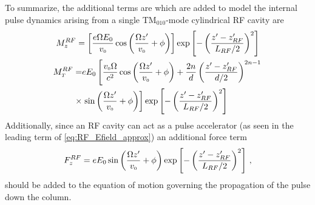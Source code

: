 To summarize, the additional terms are which are added to model the internal pulse dynamics arising from a single TM$_{010}$-mode cylindrical RF cavity are
\begin{gather}
  M_{z}^{RF} = \left [ \frac{ e \Omega E_{0} }{ v_{{\scriptscriptstyle 0}} } \cos \left ( \frac{ \Omega z^{\prime} }{ v_{{\scriptscriptstyle 0}} } + \phi \right ) \right ] \exp \left [ - \left (  \frac{ z^{\prime} - z_{RF}^{\prime} }{ L_{RF} / 2 } \right )^{ 2 } \right ] \\
  \begin{aligned}
  M_{{\scriptscriptstyle T}}^{RF} = & e E_{0} \left [ \frac{ v_{{\scriptscriptstyle 0}} \Omega }{c^{2}} \cos \left ( \frac{ \Omega z^{\prime} }{ v_{{\scriptscriptstyle 0}} } + \phi \right ) + \frac{2 n}{d} \left ( \frac{z^{\prime} - z^{\prime}_{RF}}{d / 2} \right )^{2 n - 1} \right. \\ \times & \left. \sin \left ( \frac{ \Omega z^{\prime} }{ v_{{\scriptscriptstyle 0}} } + \phi \right )
   \right ] \exp \left [ - \left (  \frac{ z^{\prime} - z_{RF}^{\prime} }{ L_{RF} / 2 } \right )^{ 2 } \right ]
  \end{aligned}
\end{gather}
Additionally, since an RF cavity can act as a pulse accelerator (as seen in the leading term of \ref{eq:RF_Efield_approx}) an additional force term
\begin{equation}
  F_{z}^{RF} = e E_{0} \sin \left ( \frac{ \Omega z^{\prime} }{ v_{{\scriptscriptstyle 0}} } + \phi \right ) \exp \left [ - \left (  \frac{ z^{\prime} - z_{RF}^{\prime} }{ L_{RF} / 2 } \right )^{ 2 } \right ] \, \text{,}
\end{equation}
should be added to the equation of motion governing the propagation of the pulse down the column.

